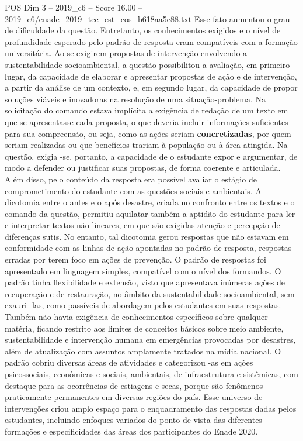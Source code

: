 \begin{textsample}{POS Dim 3 – 2019\_c6 – Score 16.00 – 2019\_c6/enade\_2019\_tec\_est\_cos\_b618aa5e88.txt}
Esse fato aumentou o grau de dificuldade da questão.
Entretanto, os conhecimentos exigidos e o nível de profundidade esperado pelo padrão de resposta eram compatíveis com a formação universitária.
Ao se exigirem propostas de intervenção envolvendo a sustentabilidade socioambiental, a questão possibilitou a avaliação, em primeiro lugar, da capacidade de elaborar e apresentar propostas de ação e de intervenção, a partir da análise de um contexto, e, em segundo lugar, da capacidade de propor soluções viáveis e inovadoras na resolução de uma situação-problema.
Na solicitação do comando estava implícita a exigência de redação de um texto em que se apresentasse cada proposta, o que deveria incluir informações suficientes para sua compreensão, ou seja, como as ações seriam \textbf{concretizadas}, por quem seriam realizadas ou que benefícios trariam à população ou à área atingida.
Na questão, exigia -se, portanto, a capacidade de o estudante expor e argumentar, de modo a defender ou justificar suas propostas, de forma coerente e articulada.
Além disso, pelo conteúdo da resposta era possível avaliar o estágio de comprometimento do estudante com as questões sociais e ambientais.
A dicotomia entre o antes e o após desastre, criada no confronto entre os textos e o comando da questão, permitiu aquilatar também a aptidão do estudante para ler e interpretar textos não lineares, em que são exigidas atenção e percepção de diferenças sutis.
No entanto, tal dicotomia gerou respostas que não estavam em conformidade com as linhas de ação apontadas no padrão de resposta, respostas erradas por terem foco em ações de prevenção.
O padrão de respostas foi apresentado em linguagem simples, compatível com o nível dos formandos.
O padrão tinha flexibilidade e extensão, visto que apresentava inúmeras ações de recuperação e de restauração, no âmbito da sustentabilidade socioambiental, sem exauri -las, como passíveis de abordagem pelos estudantes em suas respostas.
Também não havia exigência de conhecimentos específicos sobre qualquer matéria, ficando restrito aos limites de conceitos básicos sobre meio ambiente, sustentabilidade e intervenção humana em emergências provocadas por desastres, além de atualização com assuntos amplamente tratados na mídia nacional.
O padrão cobriu diversas áreas de atividades e categorizou -as em ações psicossociais, econômicas e sociais, ambientais, de infraestrutura e sistêmicas, com destaque para as ocorrências de estiagens e secas, porque são fenômenos praticamente permanentes em diversas regiões do país.
Esse universo de intervenções criou amplo espaço para o enquadramento das respostas dadas pelos estudantes, incluindo enfoques variados do ponto de vista das diferentes formações e especificidades das áreas dos participantes do Enade 2020.

\end{textsample}
